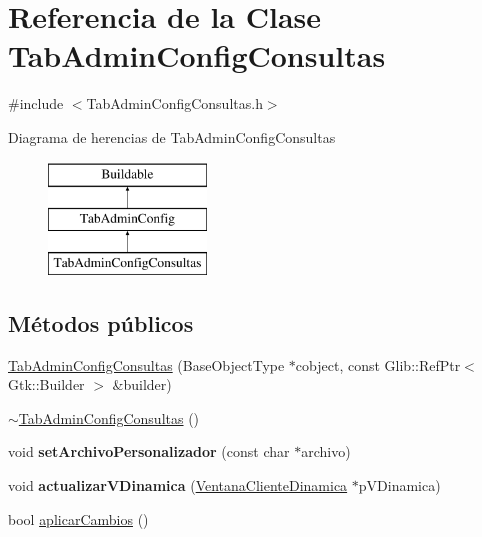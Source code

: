 \hypertarget{classTabAdminConfigConsultas}{\section{\-Referencia de la \-Clase \-Tab\-Admin\-Config\-Consultas}
\label{classTabAdminConfigConsultas}
}


{\ttfamily \#include $<$\-Tab\-Admin\-Config\-Consultas.\-h$>$}

\-Diagrama de herencias de \-Tab\-Admin\-Config\-Consultas\begin{figure}[H]
\begin{center}
\leavevmode
\includegraphics[height=3.000000cm]{classTabAdminConfigConsultas}
\end{center}
\end{figure}
\subsection*{\-Métodos públicos}
\begin{DoxyCompactItemize}
\item 
\hyperlink{classTabAdminConfigConsultas_a529d28b4a22a8984f12d427fa8fa1726}{\-Tab\-Admin\-Config\-Consultas} (\-Base\-Object\-Type $\ast$cobject, const \-Glib\-::\-Ref\-Ptr$<$ \-Gtk\-::\-Builder $>$ \&builder)
\item 
\hyperlink{classTabAdminConfigConsultas_adee34fa98593b7a183de3664c64ef2eb}{$\sim$\-Tab\-Admin\-Config\-Consultas} ()
\item 
\hypertarget{classTabAdminConfigConsultas_a093179a2b882ef20375d44594145275e}{void {\bfseries set\-Archivo\-Personalizador} (const char $\ast$archivo)}\label{classTabAdminConfigConsultas_a093179a2b882ef20375d44594145275e}

\item 
\hypertarget{classTabAdminConfigConsultas_a7a17ae8af5a51e1308c831efcf5cb33d}{void {\bfseries actualizar\-V\-Dinamica} (\hyperlink{classVentanaClienteDinamica}{\-Ventana\-Cliente\-Dinamica} $\ast$p\-V\-Dinamica)}\label{classTabAdminConfigConsultas_a7a17ae8af5a51e1308c831efcf5cb33d}

\item 
bool \hyperlink{classTabAdminConfigConsultas_a4af1db36431135233096d4999ac5f367}{aplicar\-Cambios} ()
\end{DoxyCompactItemize}


